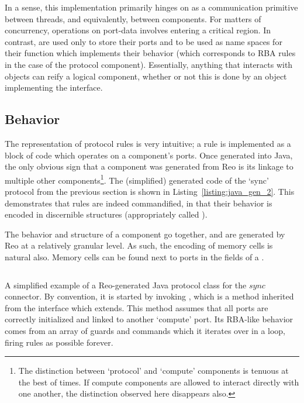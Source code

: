 In a sense, this implementation primarily hinges on  as a communication primitive between threads, and equivalently, between components. For matters of concurrency, operations on port-data involves entering a critical region. In contrast,  are used only to store their ports and to be used as name spaces for their  function which implements their behavior (which corresponds to RBA rules in the case of the protocol component). Essentially, anything that interacts with  objects can reify a logical component, whether or not this is done by an object implementing the  interface.

\subsection{Behavior}
The representation of protocol rules is very intuitive; a rule is implemented as a block of code which operates on a component's ports. Once generated into Java, the only obvious sign that a component was generated from Reo is its linkage to multiple other components\footnote{The distinction between `protocol' and `compute' components is tenuous at the best of times. If compute components are allowed to interact directly with one another, the distinction observed here disappears also.}. The (simplified) generated  code of the `sync' protocol from the previous section is shown in Listing~\ref{listing:java_gen_2}. This demonstrates that rules are indeed commandified, in that their behavior is encoded in discernible structures (appropriately called ).

The behavior and structure of a component go together, and are generated by Reo at a relatively granular level. As such, the encoding of memory cells is natural also. Memory cells can be found next to ports in the fields of a .

\begin{listing}[h!]
	\centering
	\inputminted{java}{java_gen_2.java}
	\caption[Reo-generated Java protocol class of the sync connector.]{A simplified example of a Reo-generated Java protocol class for the $sync$ connector. By convention, it is started by invoking , which is a method inherited from the  interface which  extends. This method assumes that all ports are correctly initialized and linked to another `compute' port. Its RBA-like behavior comes from an array of guards and commands which it iterates over in a loop, firing rules as possible forever.}
	\label{listing:java_gen_2}
\end{listing}

